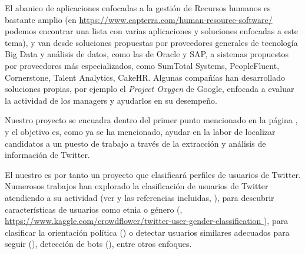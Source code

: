 El abanico de aplicaciones enfocadas a la gestión de Recursos humanos es bastante amplio
(en \url{https://www.capterra.com/human-resource-software/ } podemos encontrar una lista con
varias aplicaciones y soluciones enfocadas a este tema), y van desde soluciones propuestas
por proveedores generales de tecnología Big Data y análisis de datos,
como las de Oracle y SAP, a sistemas propuestos por proveedores más especializados, 
como SumTotal Systems, PeopleFluent, Cornerstone, Talent Analytics, CakeHR.
Algunas compañías han desarrollado soluciones propias,
por ejemplo el {\em Project Oxygen} de Google, enfocada a evaluar la actividad de los managers y 
ayudarlos en su desempeño.

Nuestro proyecto se encuadra dentro del primer punto mencionado en la página 
\pageref{item:puntodeproyecto}, y el objetivo es, como ya se ha mencionado,
ayudar en la labor de localizar candidatos a un puesto de trabajo
a través de la extracción y análisis de información de Twitter.

El nuestro es por tanto un proyecto que clasificará perfiles de usuarios de Twitter.
Numerosos  trabajos han explorado la clasificación de usuarios de Twitter
atendiendo a su actividad (ver \cite{tesis_mariluz} y las referencias
incluidas, \cite{user_class5}), para descubrir 
características de usuarios como etnia o género (\cite{user_class1}, \url{https://www.kaggle.com/crowdflower/twitter-user-gender-classification }),
para clasificar la orientación política (\cite{user_class2}) o 
detectar usuarios similares adecuados para seguir (\cite{user_class3}),
detección de bots (\cite{user_class4}), entre otros enfoques.
 

